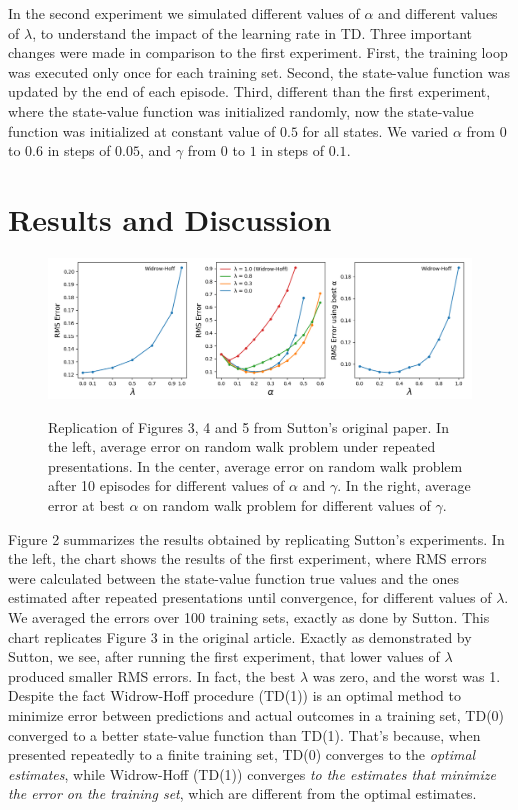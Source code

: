 \documentclass{article}
\begin{document}
In the second experiment we simulated different values of $\alpha$ and different values of $\lambda$, to understand the impact of the learning rate in TD.
Three important changes were made in comparison to the first experiment.
First, the training loop was executed only once for each training set.
Second, the state-value function was updated by the end of each episode.
Third, different than the first experiment, where the state-value function was initialized randomly, now the state-value function was initialized at constant value of $0.5$ for all states.
We varied $\alpha$ from $0$ to $0.6$ in steps of $0.05$, and $\gamma$ from $0$
 to $1$ in steps of $0.1$.

\section{Results and Discussion}
\label{sec:results}
\begin{figure}[t]
    \includegraphics[width=\textwidth]{./images/figure.png}
    \centering
    \label{fig:fig2}
    \caption{Replication of Figures 3, 4 and 5 from Sutton's original paper.
    In the left, average error on random walk problem under repeated presentations.
    In the center, average error on random walk problem after 10 episodes for different values of $\alpha$ and $\gamma$.
    In the right, average error at best $\alpha$ on random walk problem for different values of $\gamma$.}
\end{figure}

Figure 2 summarizes the results obtained by replicating Sutton's experiments.
In the left, the chart shows the results of the first experiment, where RMS errors were calculated between the state-value function true values and the ones estimated after repeated presentations until convergence, for different values of $\lambda$.
We averaged the errors over 100 training sets, exactly as done by Sutton.
This chart replicates Figure 3 in the original article.
Exactly as demonstrated by Sutton, we see, after running the first experiment, that lower values of $\lambda$ produced smaller RMS errors.
In fact, the best $\lambda$ was zero, and the worst was 1.
Despite the fact Widrow-Hoff procedure (TD(1)) is an optimal method to minimize error between predictions and actual outcomes in a training set, TD(0) converged to a better state-value function than TD(1).
That's because, when presented repeatedly to a finite training set, TD(0) converges to the \emph{optimal estimates}, while Widrow-Hoff (TD(1)) converges \emph{to the estimates that minimize the error on the training set}, which are different from the optimal estimates.
\end{document}
